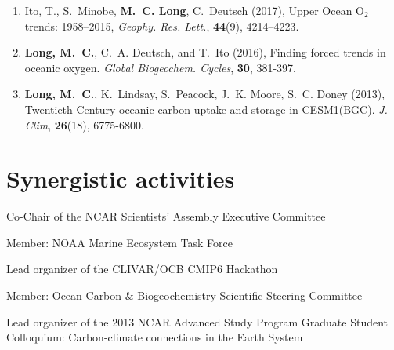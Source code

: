 \documentclass[12pt]{article}
\begin{document}
\begin{enumerate}[leftmargin=1.5em,font=\normalfont]
\item
Ito, T., S.~Minobe, \textbf{M.~C. Long}, C.~Deutsch (2017), {Upper Ocean O$_2$ trends: 1958--2015}, \textit{Geophy. Res. Lett.}, \textbf{44}(9), 4214--4223.

\item
\textbf{{Long}, M.~C.}, C.~A. {Deutsch}, and T.~Ito (2016), Finding forced trends in oceanic oxygen. \textit{Global Biogeochem. Cycles}, \textbf{30}, 381-397.

\item
\textbf{Long, M.~C.}, K.~Lindsay, S.~Peacock, J.~K. Moore, S.~C. Doney (2013), {Twentieth-Century oceanic carbon uptake and storage in CESM1(BGC)}. \textit{J. Clim}, \textbf{26}(18), 6775-6800.

\end{enumerate}

\section{Synergistic activities}

\begin{description}[style=multiline,leftmargin=2.8cm,font=\normalfont]
\setlength{\itemsep}{-0.3em}
\item[2020-2022] Co-Chair of the NCAR Scientists’ Assembly Executive Committee
\item[2020-2023] Member: NOAA Marine Ecosystem Task Force
\item[2019] Lead organizer of the CLIVAR/OCB CMIP6 Hackathon
\item[2018-2020] Member: Ocean Carbon \& Biogeochemistry Scientific Steering Committee
\item[2013] Lead organizer of the 2013 NCAR Advanced Study Program Graduate Student
Colloquium: Carbon-climate connections in the Earth System
\end{description}
\end{document}
